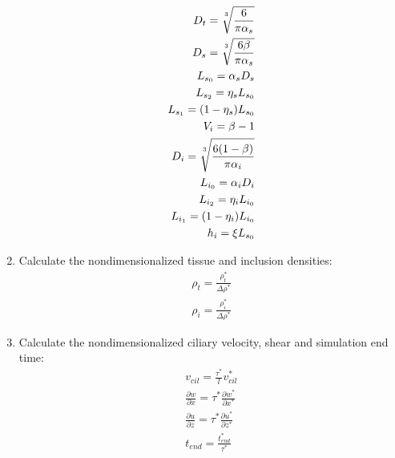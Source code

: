 \documentclass[10pt,a4paper]{article}
\def\non{\nonumber}
\def\p{\partial}
\def\l{\mathit{l}}
\begin{document}
\begin{enumerate}
	\begin{eqnarray}\label{d2ndpars4a}
		D_t = \sqrt[\uproot{5}3]{\frac{6}{\pi \alpha_s}} \non \\
		D_s = \sqrt[\uproot{5}3]{\frac{6 \beta}{\pi \alpha_s}} \non \\
		L_{s_0} = \alpha_s D_s \non \\
		L_{s_2} = \eta_s L_{s_0} \non \\
		 L_{s_1} = (1 - \eta_s) L_{s_0} \non \\
		V_i = \beta - 1 \non \\
		D_i = \sqrt[\uproot{5}3]{\frac{6 (1-\beta)}{\pi \alpha_i}} \non \\
		L_{i_0} = \alpha_i D_i \non \\
		L_{i_2} = \eta_i L_{i_0} \non \\
		 L_{i_1} = (1 - \eta_i) L_{i_0} \non \\
		h_i = \xi L_{s_0} 
	\end{eqnarray}
	\item Calculate the nondimensionalized tissue and inclusion densities:
	\begin{eqnarray}\label{d2ndpars5}
		\rho_t = \frac{\rho_t^*}{\Delta \rho^*} \non \\
		\rho_i = \frac{\rho_i^*}{\Delta \rho^*}
	\end{eqnarray}
	\item Calculate the nondimensionalized ciliary velocity, shear and simulation end time:
	\begin{eqnarray}\label{d2ndpars6}
		v_{cil} = \frac{{\tau^*}}{\l}  v^*_{cil} \non \\
		\frac{\p w}{\p x} = \tau^* \frac{\p w^*}{\p x^*} \non \\
		\frac{\p u}{\p z} = \tau^* \frac{\p u^*}{\p z^*} \non \\
		t_{end} = \frac{t^*_{end}}{\tau^*}
	\end{eqnarray}
\end{enumerate}

\newpage 
\end{document}
